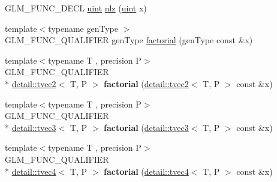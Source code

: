 \begin{DoxyCompactItemize}
\item 
G\-L\-M\-\_\-\-F\-U\-N\-C\-\_\-\-D\-E\-C\-L \hyperlink{group__core__precision_ga4fd29415871152bfb5abd588334147c8}{uint} \hyperlink{group__gtx__integer_gacbe62fd2384464c16ea30ecc4defc11c}{nlz} (\hyperlink{group__core__precision_ga4fd29415871152bfb5abd588334147c8}{uint} x)
\item 
{\footnotesize template$<$typename gen\-Type $>$ }\\G\-L\-M\-\_\-\-F\-U\-N\-C\-\_\-\-Q\-U\-A\-L\-I\-F\-I\-E\-R gen\-Type \hyperlink{group__gtx__integer_ga8cbd3120905f398ec321b5d1836e08fb}{factorial} (gen\-Type const \&x)
\item 
\hypertarget{namespaceglm_a994e144c2b5dc27b1925f4cc615881cd}{{\footnotesize template$<$typename T , precision P$>$ }\\G\-L\-M\-\_\-\-F\-U\-N\-C\-\_\-\-Q\-U\-A\-L\-I\-F\-I\-E\-R \\*
\hyperlink{structglm_1_1detail_1_1tvec2}{detail\-::tvec2}$<$ T, P $>$ {\bfseries factorial} (\hyperlink{structglm_1_1detail_1_1tvec2}{detail\-::tvec2}$<$ T, P $>$ const \&x)}\label{namespaceglm_a994e144c2b5dc27b1925f4cc615881cd}

\item 
\hypertarget{namespaceglm_a711b1e0a9becb300d38fcbe681bf5044}{{\footnotesize template$<$typename T , precision P$>$ }\\G\-L\-M\-\_\-\-F\-U\-N\-C\-\_\-\-Q\-U\-A\-L\-I\-F\-I\-E\-R \\*
\hyperlink{structglm_1_1detail_1_1tvec3}{detail\-::tvec3}$<$ T, P $>$ {\bfseries factorial} (\hyperlink{structglm_1_1detail_1_1tvec3}{detail\-::tvec3}$<$ T, P $>$ const \&x)}\label{namespaceglm_a711b1e0a9becb300d38fcbe681bf5044}

\item 
\hypertarget{namespaceglm_a2f731382ce9ba7fb318d3a41ce25b84a}{{\footnotesize template$<$typename T , precision P$>$ }\\G\-L\-M\-\_\-\-F\-U\-N\-C\-\_\-\-Q\-U\-A\-L\-I\-F\-I\-E\-R \\*
\hyperlink{structglm_1_1detail_1_1tvec4}{detail\-::tvec4}$<$ T, P $>$ {\bfseries factorial} (\hyperlink{structglm_1_1detail_1_1tvec4}{detail\-::tvec4}$<$ T, P $>$ const \&x)}\label{namespaceglm_a2f731382ce9ba7fb318d3a41ce25b84a}


\end{DoxyCompactItemize}
